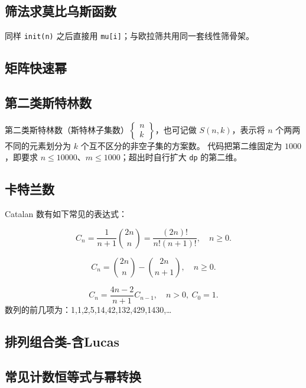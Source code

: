 \documentclass[11pt,a4paper,twocolumn]{ctexart}  %
\begin{document}
\subsection{筛法求莫比乌斯函数}
同样 \texttt{init(n)} 之后直接用 \texttt{mu[i]}；与欧拉筛共用同一套线性筛骨架。



\newpage
\subsection{矩阵快速幂}



\subsection{第二类斯特林数}

第二类斯特林数（斯特林子集数）$\begin{Bmatrix}n\\ k\end{Bmatrix}$，也可记做 $S(n,k)$，表示将 $n$ 个两两不同的元素划分为 $k$ 个互不区分的非空子集的方案数。
代码把第二维固定为 $1000$，即要求 $n\le 10000$、$m\le 1000$；超出时自行扩大 \texttt{dp} 的第二维。



\newpage
\subsection{卡特兰数}
Catalan 数有如下常见的表达式：

\[
C_n = \frac{1}{n+1}\binom{2n}{n} = \frac{(2n)!}{n!(n+1)!},\quad n\ge 0. \tag{1}
\]

\[
C_n = \binom{2n}{n} - \binom{2n}{n+1},\quad n \ge 0. \tag{2}
\]

\[
C_n = \frac{4n-2}{n+1}C_{n-1},\quad n>0,\ C_0=1. \tag{3}
\]
数列的前几项为：1,1,2,5,14,42,132,429,1430,…
\subsection{排列组合类-含Lucas}

\subsection{常见计数恒等式与幂转换}
\end{document}

